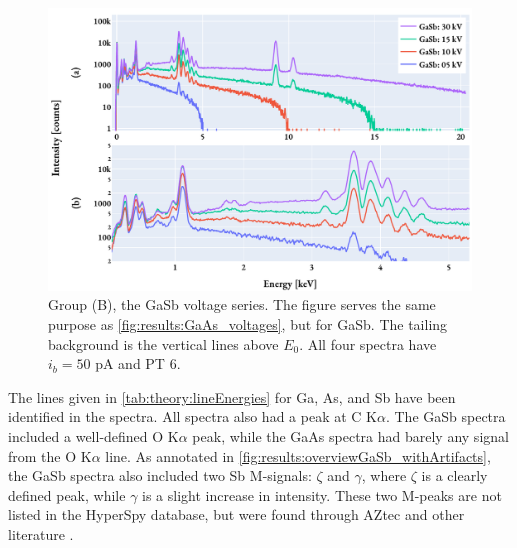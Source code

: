 \begin{figure}[hbtp]
    \centering
    \includegraphics[width=0.85\linewidth]{figures/results/GaSb_voltages.pdf}
    \caption{
        Group (B), the GaSb voltage series.
        The figure serves the same purpose as \cref{fig:results:GaAs_voltages}, but for GaSb.
        The tailing background is the vertical lines above $E_0$.
        All four spectra have $i_b = 50$ pA and PT $6$.
    }
    \label{fig:results:GaSb_voltages}
\end{figure}




The lines given in \cref{tab:theory:lineEnergies} for Ga, As, and Sb have been identified in the spectra.
All spectra also had a peak at C K$\alpha$.
The GaSb spectra included a well-defined O K$\alpha$ peak, while the GaAs spectra had barely any signal from the O K$\alpha$ line.
As annotated in \cref{fig:results:overviewGaSb_withArtifacts}, the GaSb spectra also included two Sb M-signals: $\zeta$ and $\gamma$, where $\zeta$ is a clearly defined peak, while $\gamma$ is a slight increase in intensity.
These two M-peaks are not listed in the HyperSpy database, but were found through AZtec \cite{aztec_manual} and other literature \cite{liao2006practical}.





